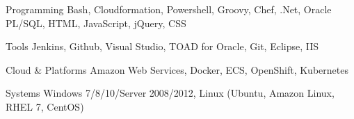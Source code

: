 

\begin{cvskills}

  \cvskill
    {Programming} %
    {Bash, Cloudformation, Powershell, Groovy, Chef, .Net, Oracle PL/SQL, HTML, JavaScript, jQuery, CSS} %

  \cvskill
    {Tools} %
    {Jenkins, Github, Visual Studio, TOAD for Oracle, Git, Eclipse, IIS} %

  \cvskill
    {Cloud \& Platforms} %
    {Amazon Web Services, Docker, ECS, OpenShift, Kubernetes} %

  \cvskill
    {Systems} %
    {Windows 7/8/10/Server 2008/2012, Linux (Ubuntu, Amazon Linux, RHEL 7, CentOS)} %

\end{cvskills}
